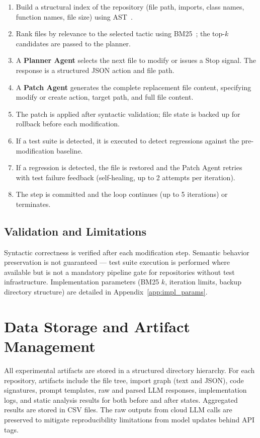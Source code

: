 \begin{enumerate}
    \item Build a structural index of the repository (file path, imports, class names, function names, file size) using AST~\cite{zhang2023repocoder}.
    \item Rank files by relevance to the selected tactic using BM25~\cite{robertson2009probabilistic}; the top-$k$ candidates are passed to the planner.
    \item A \textbf{Planner Agent} selects the next file to modify or issues a Stop signal. The response is a structured JSON action and file path.
    \item A \textbf{Patch Agent} generates the complete replacement file content, specifying modify or create action, target path, and full file content.
    \item The patch is applied after syntactic validation; file state is backed up for rollback before each modification.
    \item If a test suite is detected, it is executed to detect regressions against the pre-modification baseline.
    \item If a regression is detected, the file is restored and the Patch Agent retries with test failure feedback (self-healing, up to 2 attempts per iteration).
    \item The step is committed and the loop continues (up to 5 iterations) or terminates.
\end{enumerate}

\subsection{Validation and Limitations}

Syntactic correctness is verified after each modification step. Semantic behavior preservation is not guaranteed — test suite execution is performed where available but is not a mandatory pipeline gate for repositories without test infrastructure. Implementation parameters (BM25 $k$, iteration limits, backup directory structure) are detailed in Appendix~\ref{app:impl_params}.

\section{Data Storage and Artifact Management}

All experimental artifacts are stored in a structured directory hierarchy. For each repository, artifacts include the file tree, import graph (text and JSON), code signatures, prompt templates, raw and parsed LLM responses, implementation logs, and static analysis results for both before and after states. Aggregated results are stored in CSV files. The raw outputs from cloud LLM calls are preserved to mitigate reproducibility limitations from model updates behind API tags.

